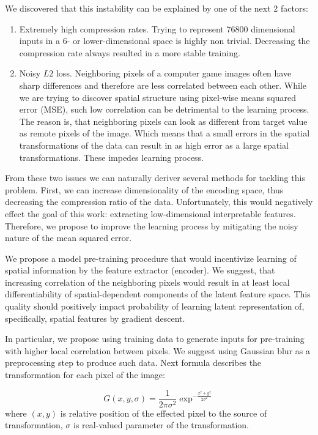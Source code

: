We discovered that this instability can be explained by one of the next 2 factors:
\begin{enumerate}
  \item Extremely high compression rates. Trying to represent 76800 dimensional inputs in a 6- or lower-dimensional space is highly non trivial. Decreasing the compression rate always resulted in a more stable training.
  \item Noisy $L2$ loss. Neighboring pixels of a computer game images often have sharp differences and therefore are less correlated between each other.
  While we are trying to discover spatial structure using pixel-wise means squared error (MSE), such low correlation can be detrimental to the learning process.
  The reason is, that neighboring pixels can look as different from target value as remote pixels of the image.
  Which means that a small errors in the spatial transformations of the data can result in as high error as a large spatial transformations.
  These impedes learning process.
\end{enumerate}

From these two issues we can naturally deriver several methods for tackling this problem.
First, we can increase dimensionality of the encoding space, thus decreasing the compression ratio of the data.
Unfortunately, this would negatively effect the goal of this work: extracting low-dimensional interpretable features.
Therefore, we propose to improve the learning process by mitigating the noisy nature of the mean squared error.

We propose a model pre-training procedure that would incentivize learning of spatial information by the feature extractor (encoder).
We suggest, that increasing correlation of the neighboring pixels would result in at least local differentiability of spatial-dependent components of the latent feature space.
This quality should positively impact probability of learning latent representation of, specifically, spatial features by gradient descent.

In particular, we propose using training data to generate inputs for pre-training with higher local correlation between pixels.
We suggest using Gaussian blur as a preprocessing step to produce such data.
Next formula describes the transformation for each pixel of the image:

\begin{equation}
  G(x, y, \sigma) = \frac{1}{2\pi\sigma^2}\exp^{-\frac{x^2+y^2}{2\sigma^2}}
\end{equation}
where $(x, y)$ is relative position of the effected pixel to the source of transformation, $\sigma$ is real-valued parameter of the transformation.

